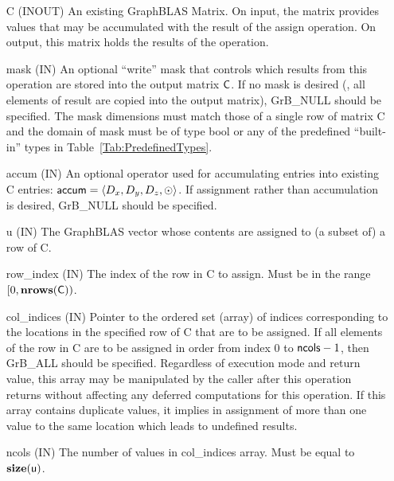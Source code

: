 \begin{itemize}[leftmargin=1.1in]
    \item[{\sf C}]    ({\sf INOUT}) An existing GraphBLAS Matrix.  On input,
    the matrix provides values that may be accumulated with the result of the
    assign operation.  On output, this matrix holds the results of the
    operation.

    \item[{\sf mask}]  ({\sf IN}) An optional ``write'' mask that controls which
    results from this operation are stored into the output matrix
    ${\sf C}$.  If no mask is desired (\ie, all elements
    of result are copied into the output matrix), {\sf GrB\_NULL}
    should be specified. The mask dimensions must match those of a single row
    of matrix {\sf C} and the domain of {\sf mask} must be
    of type {\sf bool} or any of the predefined ``built-in'' types in
    Table~\ref{Tab:PredefinedTypes}.
    
    \item[{\sf accum}]    ({\sf IN}) An optional operator used for accumulating
    entries into existing {\sf C} entries: ${\sf accum} = \langle D_x,
    D_y, D_z,\odot \rangle$. If assignment rather than accumulation is
    desired, {\sf GrB\_NULL} should be specified.

    \item[{\sf u}]       ({\sf IN}) The GraphBLAS vector whose contents are 
    assigned to (a subset of) a row of {\sf C}.

    \item[{\sf row\_index}]  ({\sf IN}) The index of the row in {\sf C} to 
    assign. Must be in the range $[0, \bold{nrows}({\sf C}))$.

    \item[{\sf col\_indices}]  ({\sf IN}) Pointer to the ordered set (array) of 
    indices corresponding to the locations in the specified row of {\sf C} 
    that are to be assigned.  If all elements of the row in {\sf C} are to be 
    assigned in order from index $0$ to ${\sf ncols} - 1$, then {\sf GrB\_ALL} should be 
    specified.  Regardless of execution mode and return value, this array may be
    manipulated by the caller after this operation returns without affecting any 
    deferred computations for this operation.
    If this array contains duplicate values, it implies in assignment of more 
    than one value to the same location which leads to undefined results.
    
    \item[{\sf ncols}] ({\sf IN}) The number of values in {\sf col\_indices} array.
    Must be equal to $\bold{size}({\sf u})$.
    

\end{itemize}
